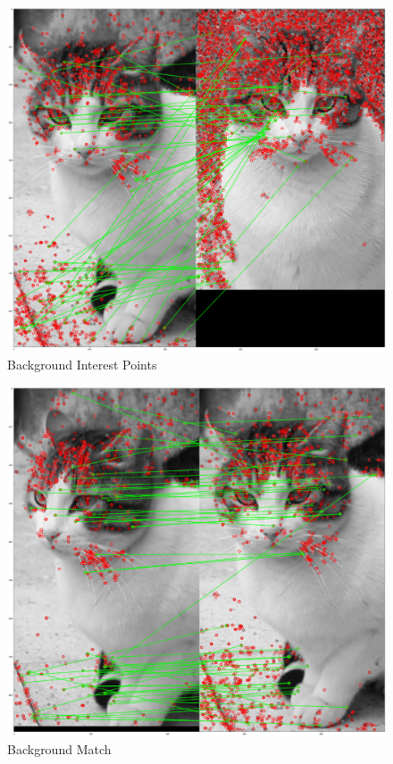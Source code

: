 \begin{figure}
    \centering
    \includegraphics[width=\linewidth]{content/040_image_processing/identification/img/birsuruBackground.png}
    \caption{Background Interest Points}
    \label{fig:background_interest_points}
\end{figure}

\begin{figure}
    \centering
    \includegraphics[width=\linewidth]{content/040_image_processing/identification/img/iyiMatchSIFTYuz.png}
    \caption{Background Match}
    \label{fig:iyiKedi}
\end{figure}

